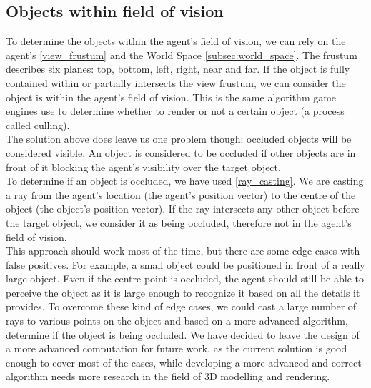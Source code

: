 \subsection{Objects within field of vision}\label{subsec:visible_objects}
To determine the objects within the agent's field of vision, we can rely on the agent's \ref{view_frustum} and the World Space \ref{subsec:world_space}. The frustum describes six planes: top, bottom, left, right, near and far. If the object is fully contained within or partially intersects the view frustum, we can consider the object is within the agent's field of vision. This is the same algorithm game engines use to determine whether to render or not a certain object (a process called culling).\\

The solution above does leave us one problem though: occluded objects will be considered visible. An object is considered to be occluded if other objects are in front of it blocking the agent's visibility over the target object.\\

To determine if an object is occluded, we have used \ref{ray_casting}. We are casting a ray from the agent's location (the agent's position vector) to the centre of the object (the object's position vector). If the ray intersects any other object before the target object, we consider it as being occluded, therefore not in the agent's field of vision.\\

This approach should work most of the time, but there are some edge cases with false positives. For example, a small object could be positioned in front of a really large object. Even if the centre point is occluded, the agent should still be able to perceive the object as it is large enough to recognize it based on all the details it provides. To overcome these kind of edge cases, we could cast a large number of rays to various points on the object and based on a more advanced algorithm, determine if the object is being occluded. We have decided to leave the design of a more advanced computation for future work, as the current solution is good enough to cover most of the cases, while developing a more advanced and correct algorithm needs more research in the field of 3D modelling and rendering.\\

